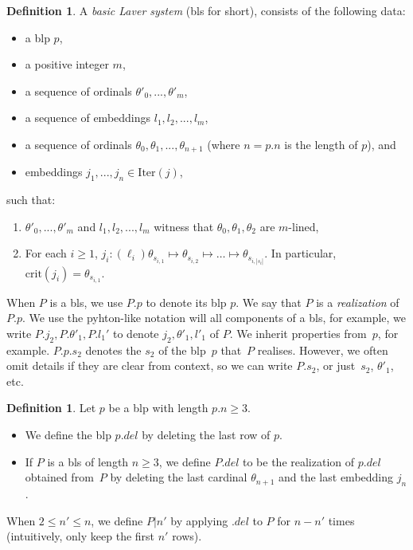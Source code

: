 \documentclass{article}
\theoremstyle{definition}
\newtheorem{definition}[lemma]{Definition}
\theoremstyle{remark}
\begin{document}
\begin{definition}
    A \textit{basic Laver system} (bls for short), consists of the following data: 
    \begin{itemize}
      \item a blp $p$,
      \item a positive integer $m$,
      \item a sequence of ordinals $\theta'_0,...,\theta'_{m}$,
      \item a sequence of embeddings $l_1,l_2,...,l_{m}$,
      \item a sequence of ordinals $\theta_0,\theta_1,...,\theta_{n+1}$ (where $n=p.n$ is the length of $p$), and
      \item embeddings $j_1,...,j_{n}\in \mathrm{Iter}(j)$,
    \end{itemize}
    such that:
    \begin{enumerate}
      \item $\theta'_0,...,\theta'_{m}$ and $l_1,l_2,...,l_{m}$ witness that $\theta_0,\theta_1,\theta_2$ are $m$-lined,
      \item For each $i\ge 1$, $j_i:(\ell_i)\theta_{s_{i,1}}\mapsto \theta_{s_{i,2}} \mapsto \dots \mapsto\theta_{s_{i,|s_i|}}$. In particular, $\mathrm{crit}(j_i)=\theta_{s_{i,1}}$.
    \end{enumerate}
\end{definition}

When $P$ is a bls, we use $P.p$ to denote its blp $p$. We say that $P$ is a \emph{realization} of $P.p$. We use the pyhton-like notation will all components of a bls, for example, we write $P.j_{2}, P.\theta'_1, P.l_1'$ to denote $j_2,\theta'_1,l'_1$ of $P$. We inherit properties from~$p$, for example. $P.p.s_2$ denotes the $s_2$ of the blp~$p$ that~$P$ realises. However, we often omit details if they are clear from context, so we can write $P.s_2$, or just~$s_2$, $\theta'_1$, etc.


\begin{definition}
  Let $p$ be a blp with length $p.n\ge 3$. 
  \begin{itemize}
    \item We define the blp $p.del$ by deleting the last row of $p$.
    \item If $P$ is a bls of length $n\ge 3$, we define $P.del$ to be the realization of $p.del$ obtained from~$P$ by deleting the last cardinal $\theta_{n+1}$ and the last embedding $j_n$.
  \end{itemize}
  When $2\le n'\le n$, we define $P|n'$ by applying $.del$ to $P$ for $n-n'$ times (intuitively, only keep the first $n'$ rows).
\end{definition}
\end{document}
